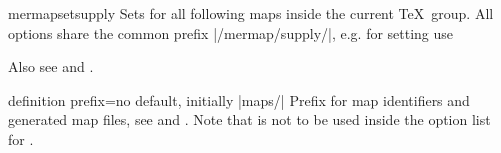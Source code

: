 \begin{docCommand}{mermapsetsupply}{}
  Sets  for all following maps inside the current \TeX\ group.
  All options share the common prefix |/mermap/supply/|, e.g. for setting
   use
  \begin{dispListing}
  \end{dispListing}
  Also see  and .
\end{docCommand}


\begin{docMrcKey}{definition prefix}{=}{no default, initially |maps/|}
  Prefix for map identifiers and generated map files, see 
  and .
  Note that  is not to be used inside
  the option list for .
\end{docMrcKey}


